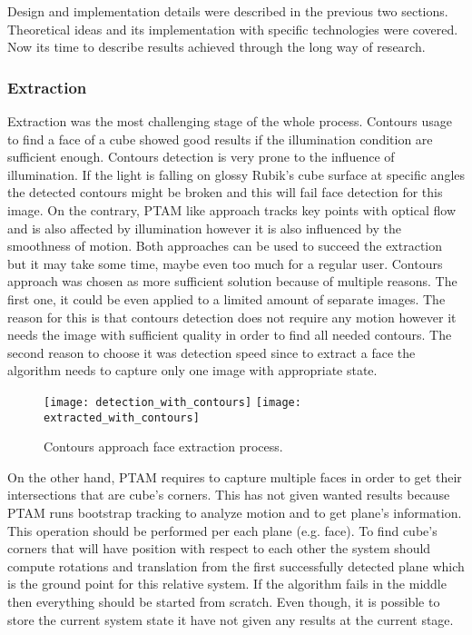 \documentclass[../../main.tex]{subfiles}
\begin{document}
Design and implementation details were described in the previous two sections. Theoretical ideas and its implementation with specific technologies were covered. Now its time to describe results achieved through the long way of research.

\subsubsection*{Extraction}

Extraction was the most challenging stage of the whole process. Contours usage to find a face of a cube showed good results if the illumination condition are sufficient enough. Contours detection is very prone to the influence of illumination. If the light is falling on glossy Rubik's cube surface at specific angles the detected contours might be broken and this will fail face detection for this image. On the contrary, \ac{PTAM} like approach tracks key points with optical flow and is also affected by illumination however it is also influenced by the smoothness of motion. Both approaches can be used to succeed the extraction but it may take some time, maybe even too much for a regular user. Contours approach was chosen as more sufficient solution because of multiple reasons. The first one, it could be even applied to a limited amount of separate images. The reason for this is that contours detection does not require any motion however it needs the image with sufficient quality in order to find all needed contours. The second reason to choose it was detection speed since to extract a face the algorithm needs to capture only one image with appropriate state. 

\begin{figure} [ht!]
    \begin{center}
        \texttt{[image: detection\_with\_contours]}
        \texttt{[image: extracted\_with\_contours]}
        \caption{Contours approach face extraction process.}
        \label{fig:contours_approach_face_detection}
    \end{center}
\end{figure}

On the other hand, \ac{PTAM} requires to capture multiple faces in order to get their intersections that are cube's corners. This has not given wanted results because \ac{PTAM} runs bootstrap tracking to analyze motion and to get plane's information. This operation should be performed per each plane (e.g. face). To find cube's corners that will have position with respect to each other the system should compute rotations and translation from the first successfully detected plane which is the ground point for this relative system. If the algorithm fails in the middle then everything should be started from scratch. Even though, it is possible to store the current system state it have not given any results at the current stage.
\end{document}
